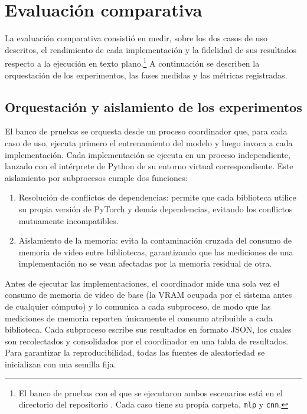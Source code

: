 \section{Evaluación comparativa}\label{sec:metodo_evaluacion}

La evaluación comparativa consistió en medir, sobre los dos casos de uso descritos, el rendimiento de cada implementación y la fidelidad de sus resultados respecto a la ejecución en texto plano.\footnote{El banco de pruebas con el que se ejecutaron ambos escenarios está en el directorio  del repositorio \cite{SDKRepo}. Cada caso tiene su propia carpeta, \nolinkurl{mlp} y \nolinkurl{cnn}.} A continuación se describen la orquestación de los experimentos, las fases medidas y las métricas registradas.

\subsection{Orquestación y aislamiento de los experimentos}

El banco de pruebas se orquesta desde un proceso coordinador que, para cada caso de uso, ejecuta primero el entrenamiento del modelo y luego invoca a cada implementación. Cada implementación se ejecuta en un proceso independiente, lanzado con el intérprete de Python de su entorno virtual correspondiente. Este aislamiento por subprocesos cumple dos funciones:

\begin{enumerate}
    \item Resolución de conflictos de dependencias: permite que cada biblioteca utilice su propia versión de PyTorch y demás dependencias, evitando los conflictos mutuamente incompatibles.
    \item Aislamiento de la memoria: evita la contaminación cruzada del consumo de memoria de video entre bibliotecas, garantizando que las mediciones de una implementación no se vean afectadas por la memoria residual de otra.
\end{enumerate}

Antes de ejecutar las implementaciones, el coordinador mide una sola vez el consumo de memoria de video de base (la VRAM ocupada por el sistema antes de cualquier cómputo) y lo comunica a cada subproceso, de modo que las mediciones de memoria reporten únicamente el consumo atribuible a cada biblioteca. Cada subproceso escribe sus resultados en formato JSON, los cuales son recolectados y consolidados por el coordinador en una tabla de resultados. Para garantizar la reproducibilidad, todas las fuentes de aleatoriedad se inicializan con una semilla fija.

